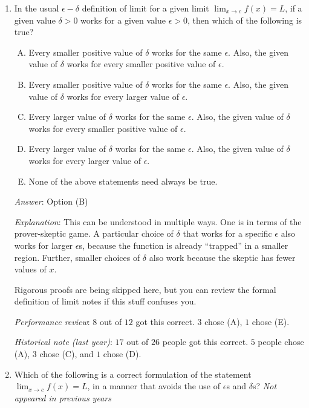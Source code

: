 \documentclass[10pt]{amsart}
\begin{document}
\begin{enumerate}
\item In the usual $\epsilon-\delta$ definition of limit for a given
  limit $\lim_{x \to c} f(x) = L$, if a given value $\delta > 0$ works
  for a given value $\epsilon > 0$, then which of the following is
  true?
  \begin{enumerate}[(A)]
  \item Every smaller positive value of $\delta$ works for the same
    $\epsilon$. Also, the given value of $\delta$ works for every
    smaller positive value of $\epsilon$.
  \item Every smaller positive value of $\delta$ works for the same
    $\epsilon$. Also, the given value of $\delta$ works for every
    larger value of $\epsilon$.
  \item Every larger value of $\delta$ works for the same
    $\epsilon$. Also, the given value of $\delta$ works for every
    smaller positive value of $\epsilon$.
  \item Every larger value of $\delta$ works for the same
    $\epsilon$. Also, the given value of $\delta$ works for every
    larger value of $\epsilon$.
  \item None of the above statements need always be true.
  \end{enumerate}

  {\em Answer}: Option (B)

  {\em Explanation}: This can be understood in multiple ways. One is
  in terms of the prover-skeptic game. A particular choice of $\delta$
  that works for a specific $\epsilon$ also works for larger
  $\epsilon$s, because the function is already ``trapped'' in a
  smaller region. Further, smaller choices of $\delta$ also work
  because the skeptic has fewer values of $x$.

  Rigorous proofs are being skipped here, but you can review the
  formal definition of limit notes if this stuff confuses you.

  {\em Performance review}: $8$ out of $12$ got this correct. $3$
  chose (A), $1$ chose (E).

  {\em Historical note (last year)}: $17$ out of $26$ people
  got this correct. $5$ people chose (A), $3$ chose (C), and $1$ chose
  (D).

\item Which of the following is a correct formulation of the statement
  $\lim_{x \to c} f(x) = L$, in a manner that avoids the use of
  $\epsilon$s and $\delta$s? {\em Not appeared in previous years}


\end{enumerate}
\end{document}
